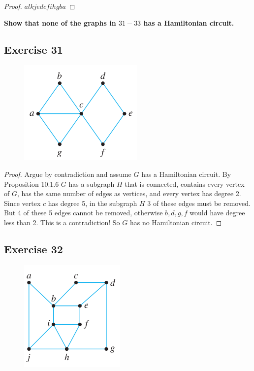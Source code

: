 \documentclass[14pt]{extarticle}
\newcommand{\cy}{\color{cyan}}
\begin{document}
\begin{proof}
    \(alkjedcfihgba\)
\end{proof}

{\bf \cy Show that none of the graphs in $31-33$ has a Hamiltonian circuit.}

\subsection{Exercise 31}
\begin{figure}[ht!]
    \centering
    \includegraphics[scale=0.6]{../images/10.1.31.png}
\end{figure}

\begin{proof}
    Argue by contradiction and assume \(G\) has a Hamiltonian circuit. By Proposition 10.1.6 \(G\) has a subgraph \(H\) that
    is connected, contains every vertex of \(G\), has the same number of edges as vertices, and every vertex has degree 2.
    Since vertex \(c\) has degree 5, in the subgraph \(H\) 3 of these edges must be removed. But 4 of these 5 edges cannot be
    removed, otherwise \(b,d,g,f\) would have degree less than 2. This is a contradiction! So \(G\) has no Hamiltonian circuit.
\end{proof}

\subsection{Exercise 32}
\begin{figure}[ht!]
    \centering
    \includegraphics[scale=0.6]{../images/10.1.32.png}
\end{figure}
\end{document}
